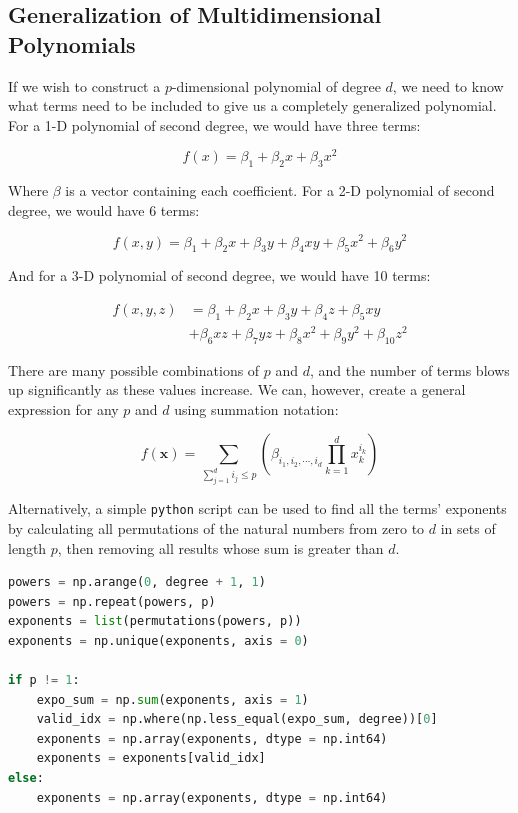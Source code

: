 \documentclass[a4paper,10pt,english]{article}
\begin{document}
\subsection{Generalization of Multidimensional Polynomials}

If we wish to construct a $p$-dimensional polynomial of degree $d$, we need to know what terms need to be included to give us a completely generalized polynomial.  For a 1-D polynomial of second degree, we would have three terms:

\begin{equation*}
f(x) = \beta_1 + \beta_2 x + \beta_3 x^2
\end{equation*}

Where $\beta$ is a vector containing each coefficient.	For a 2-D polynomial of second degree, we would have 6 terms:

\begin{equation*}
f(x,y) = \beta_1 + \beta_2 x + \beta_3 y + \beta_4 xy + \beta_5 x^2 + \beta_6 y^2
\end{equation*}

And for a 3-D polynomial of second degree, we would have 10 terms:

\begin{align*}
f(x,y,z) &= \beta_1 + \beta_2 x + \beta_3 y + \beta_4 z + \beta_5 xy \\ &+ \beta_6 xz + \beta_7 yz + \beta_8 x^2 + \beta_9 y^2 + \beta_{10} z^2
\end{align*}

There are many possible combinations of $p$ and $d$, and the number of terms blows up significantly as these values increase.  We can, however, create a general expression \cite{2482654} for any $p$ and $d$ using summation notation:

\begin{equation}
\label{eq_method_0}
f(\mathbf{x}) = \sum_{\sum_{j = 1}^d i_j \leq p} \left( \beta_{i_1, i_2, \cdots, i_d} \prod_{k = 1}^d x_k^{i_k} \right)
\end{equation}

Alternatively, a simple \texttt{python} script can be used to find all the terms' exponents by calculating all permutations of the natural numbers from zero to $d$ in sets of length $p$, then removing all results whose sum is greater than $d$.

\begin{lstlisting}[showstringspaces=false,language=Python,firstnumber = 1]
powers = np.arange(0, degree + 1, 1)
powers = np.repeat(powers, p)
exponents = list(permutations(powers, p))
exponents = np.unique(exponents, axis = 0)

if p != 1:
	expo_sum = np.sum(exponents, axis = 1)
	valid_idx = np.where(np.less_equal(expo_sum, degree))[0]
	exponents = np.array(exponents, dtype = np.int64)
	exponents = exponents[valid_idx]
else:
	exponents = np.array(exponents, dtype = np.int64)
\end{lstlisting}
\end{document}

